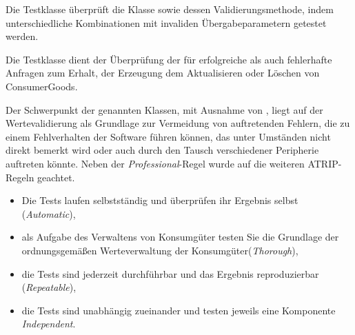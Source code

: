 Die Testklasse \href{}{} überprüft die Klasse \href{}{} sowie dessen Validierungsmethode, indem unterschiedliche Kombinationen mit invaliden Übergabeparametern getestet werden.

Die Testklasse \href{}{} dient der Überprüfung der \href{}{} für erfolgreiche als auch fehlerhafte Anfragen zum Erhalt, der Erzeugung dem Aktualisieren oder Löschen von ConsumerGoods.

Der Schwerpunkt der genannten Klassen, mit Ausnahme von \href{}{}, liegt auf der Wertevalidierung als Grundlage zur Vermeidung von auftretenden Fehlern, die zu einem Fehlverhalten der Software führen können, das unter Umständen nicht direkt bemerkt wird oder auch durch den Tausch verschiedener Peripherie auftreten könnte.
Neben der \textit{Professional}-Regel wurde auf die weiteren ATRIP-Regeln geachtet.
\begin{itemize}
    \item Die Tests laufen selbstständig und überprüfen ihr Ergebnis selbst (\textit{Automatic}),
    \item als Aufgabe des Verwaltens von Konsumgüter testen Sie die Grundlage der ordnungsgemäßen Werteverwaltung der Konsumgüter(\textit{Thorough}),
    \item die Tests sind jederzeit durchführbar und das Ergebnis reproduzierbar (\textit{Repeatable}),
    \item die Tests sind unabhängig zueinander und testen jeweils eine Komponente \textit{Independent}.
\end{itemize}

